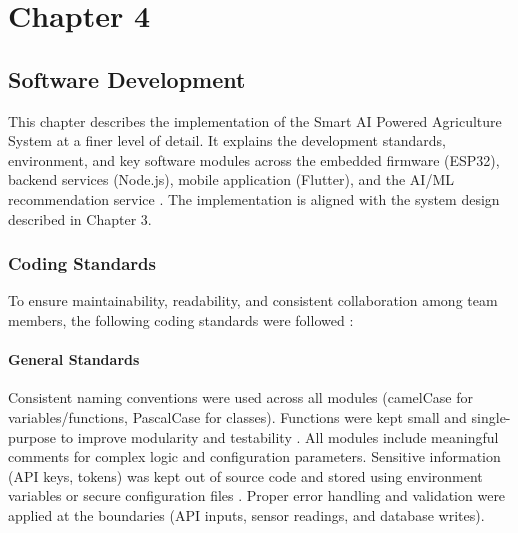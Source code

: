


\setcounter{chapter}{4}
\setcounter{figure}{0}
\setcounter{table}{0}
\chapter*{Chapter 4}
\section{Software Development}

This chapter describes the implementation of the Smart AI Powered 
Agriculture System at a finer level of detail. It explains the 
development standards, environment, and key software modules across 
the embedded firmware (ESP32), backend services (Node.js), mobile 
application (Flutter), and the AI/ML recommendation service 
\cite{thilakarathne2023fields}. The implementation is aligned with 
the system design described in Chapter 3.

\subsection{Coding Standards}
\label{sec:coding-standards}

To ensure maintainability, readability, and consistent collaboration 
among team members, the following coding standards were followed 
\cite{sommerville2016software}:

\subsubsection{General Standards}
Consistent naming conventions were used across all modules (camelCase for variables/functions, PascalCase for classes). Functions were kept small and single-purpose to improve modularity and testability \cite{sommerville2016software}. All modules include meaningful comments for complex logic and configuration parameters. Sensitive information (API keys, tokens) was kept out of source code and stored using environment variables or secure configuration files \cite{jwtauth2017}. Proper error handling and validation were applied at the boundaries (API inputs, sensor readings, and database writes).


